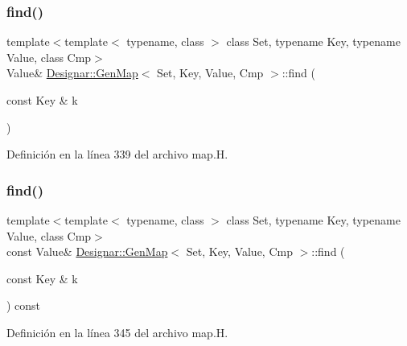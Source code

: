 \subsubsection{\texorpdfstring{find()}{find()}\hspace{0.1cm}{\footnotesize\ttfamily [1/4]}}
{\footnotesize\ttfamily template$<$template$<$ typename, class $>$ class Set, typename Key, typename Value, class Cmp$>$ \\
Value\& \hyperlink{class_designar_1_1_gen_map}{Designar\+::\+Gen\+Map}$<$ Set, Key, Value, Cmp $>$\+::find (\begin{DoxyParamCaption}\item[{const Key \&}]{k }\end{DoxyParamCaption})\hspace{0.3cm}{\ttfamily [inline]}}



Definición en la línea 339 del archivo map.\+H.

\mbox{\label{class_designar_1_1_gen_map_a0df2bf3aab592ee2343bc2855839bc96}} 
\subsubsection{\texorpdfstring{find()}{find()}\hspace{0.1cm}{\footnotesize\ttfamily [2/4]}}
{\footnotesize\ttfamily template$<$template$<$ typename, class $>$ class Set, typename Key, typename Value, class Cmp$>$ \\
const Value\& \hyperlink{class_designar_1_1_gen_map}{Designar\+::\+Gen\+Map}$<$ Set, Key, Value, Cmp $>$\+::find (\begin{DoxyParamCaption}\item[{const Key \&}]{k }\end{DoxyParamCaption}) const\hspace{0.3cm}{\ttfamily [inline]}}



Definición en la línea 345 del archivo map.\+H.

\mbox{\label{class_designar_1_1_gen_map_ae02aaa8835abada7b361da281c6125bf}} 
